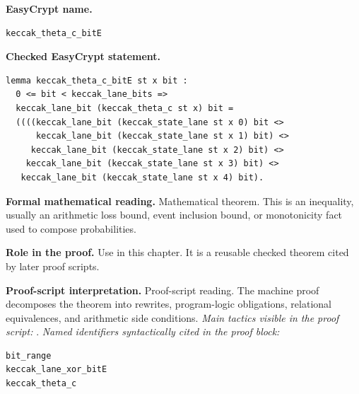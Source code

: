 \begin{formaltheorem}
\noindent\textbf{EasyCrypt name.}
\begin{lstlisting}[language=EasyCrypt,basicstyle=\ttfamily\scriptsize]
keccak_theta_c_bitE
\end{lstlisting}
\noindent\textbf{Checked EasyCrypt statement.}
\begin{lstlisting}[language=EasyCrypt,basicstyle=\ttfamily\scriptsize]
lemma keccak_theta_c_bitE st x bit :
  0 <= bit < keccak_lane_bits =>
  keccak_lane_bit (keccak_theta_c st x) bit =
  ((((keccak_lane_bit (keccak_state_lane st x 0) bit <>
      keccak_lane_bit (keccak_state_lane st x 1) bit) <>
     keccak_lane_bit (keccak_state_lane st x 2) bit) <>
    keccak_lane_bit (keccak_state_lane st x 3) bit) <>
   keccak_lane_bit (keccak_state_lane st x 4) bit).
\end{lstlisting}
\noindent\textbf{Formal mathematical reading.}
Mathematical theorem. This is an inequality, usually an arithmetic loss bound, event inclusion bound, or monotonicity fact used to compose probabilities.

\noindent\textbf{Role in the proof.}
Use in this chapter. It is a reusable checked theorem cited by later proof scripts.

\noindent\textbf{Proof-script interpretation.}
Proof-script reading. The machine proof decomposes the theorem into rewrites, program-logic obligations, relational equivalences, and arithmetic side conditions.
\emph{Main tactics visible in the proof script:} .
\emph{Named identifiers syntactically cited in the proof block:}
\begin{lstlisting}[language=EasyCrypt,basicstyle=\ttfamily\scriptsize]
bit_range
keccak_lane_xor_bitE
keccak_theta_c
\end{lstlisting}

\end{formaltheorem}


